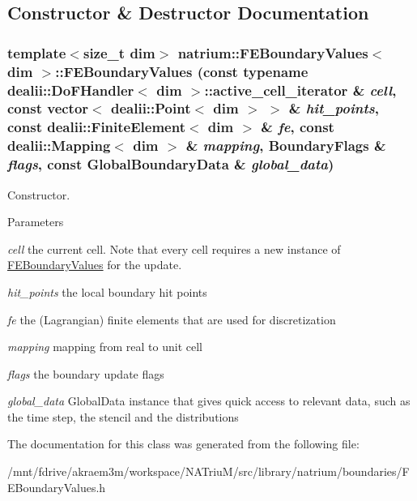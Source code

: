\subsection{Constructor \& Destructor Documentation}
\hypertarget{classnatrium_1_1FEBoundaryValues_a9122d6b193907bf21c8a091b18c7cad1}{
\subsubsection[{FEBoundaryValues}]{\setlength{\rightskip}{0pt plus 5cm}template$<$size\_\-t dim$>$ {\bf natrium::FEBoundaryValues}$<$ dim $>$::{\bf FEBoundaryValues} (const typename dealii::DoFHandler$<$ dim $>$::active\_\-cell\_\-iterator \& {\em cell}, \/  const vector$<$ dealii::Point$<$ dim $>$ $>$ \& {\em hit\_\-points}, \/  const dealii::FiniteElement$<$ dim $>$ \& {\em fe}, \/  const dealii::Mapping$<$ dim $>$ \& {\em mapping}, \/  {\bf BoundaryFlags} \& {\em flags}, \/  const {\bf GlobalBoundaryData} \& {\em global\_\-data})}}
\label{classnatrium_1_1FEBoundaryValues_a9122d6b193907bf21c8a091b18c7cad1}


Constructor. 
\begin{DoxyParams}{Parameters}
\item[{\em cell}]the current cell. Note that every cell requires a new instance of \hyperlink{classnatrium_1_1FEBoundaryValues}{FEBoundaryValues} for the update. \item[{\em hit\_\-points}]the local boundary hit points \item[{\em fe}]the (Lagrangian) finite elements that are used for discretization \item[{\em mapping}]mapping from real to unit cell \item[{\em flags}]the boundary update flags \item[{\em global\_\-data}]GlobalData instance that gives quick access to relevant data, such as the time step, the stencil and the distributions \end{DoxyParams}


The documentation for this class was generated from the following file:\begin{DoxyCompactItemize}
\item 
/mnt/fdrive/akraem3m/workspace/NATriuM/src/library/natrium/boundaries/FEBoundaryValues.h\end{DoxyCompactItemize}
